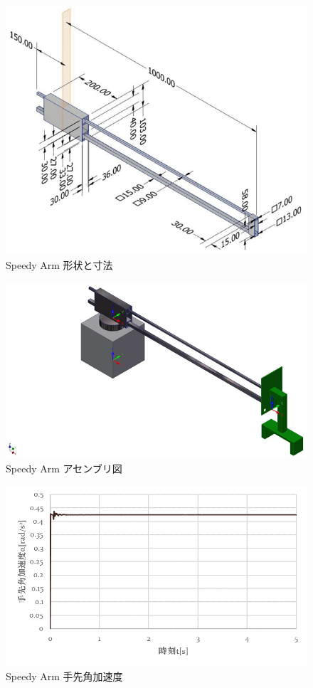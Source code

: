 \documentclass[10pt,b5paper,papersize,dvipdfmx]{jsbook}
\begin{document}
\null\vfill %
\begin{figure}[H]
  \centering
  \includegraphics[width=.8\textwidth]{img/robot22.png}
  \caption{Speedy Arm 形状と寸法}
  \label{fig:Speedy Arm 形状と寸法}
\end{figure}
%
\begin{figure}[H]
  \centering
  \includegraphics[width=.7\textwidth]{img/robot23.png}
  \caption{Speedy Arm アセンブリ図}
  \label{fig:Speedy Arm アセンブリ図}
\end{figure}
\vfill\null %
\clearpage
%
\begin{figure}[H]
  \centering
  \includegraphics[width=.68\textwidth]{img/robot24.png}
  \caption{Speedy Arm 手先角加速度}
  \label{fig:Speedy Arm 手先角加速度}
\end{figure}
\end{document}
